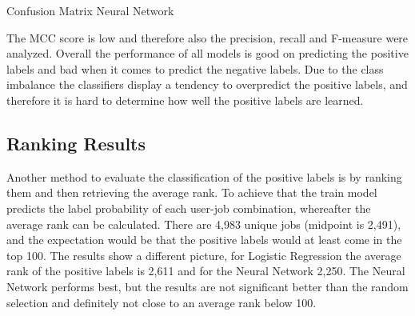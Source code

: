 \begin{table}[h]
\begin{footnotesize}

\end{footnotesize}
\caption{\label{tab:cmnn} Confusion Matrix Neural Network}
\end{table}

The MCC score is low and therefore also the precision, recall and F-measure were analyzed.
Overall the performance of all models is good on predicting the positive labels and bad when it comes to predict the negative labels.
Due to the class imbalance the classifiers display a tendency to overpredict the positive labels, and therefore it is hard to determine how well the positive labels are learned. 

\subsection{Ranking Results}
Another method to evaluate the classification of the positive labels is by ranking them and then retrieving the average rank.
To achieve that the train model predicts the label probability of each user-job combination, whereafter the average rank can be calculated.
There are 4,983 unique jobs (midpoint is 2,491), and the expectation would be that the positive labels would at least come in the top 100. 
The results show a different picture, for Logistic Regression the average rank of the positive labels is 2,611 and for the Neural Network 2,250.
The Neural Network performs best, but the results are not significant better than the random selection and definitely not close to an average rank below 100.






